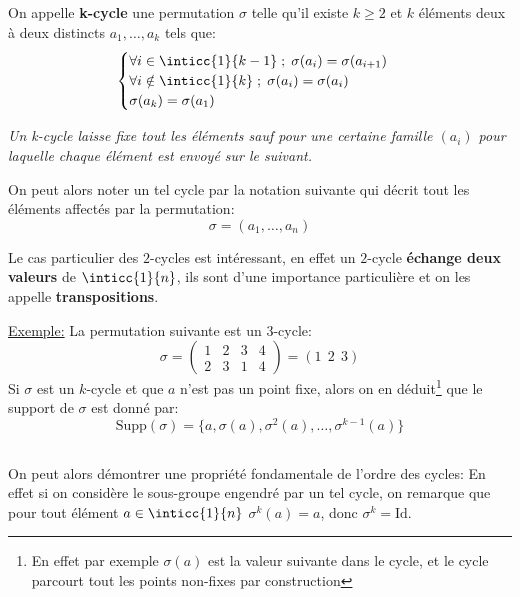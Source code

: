\subsection*{}
On appelle \textbf{k-cycle} une permutation \(\sigma\) telle qu'il existe \(k \geq 2\) et \(k\) éléments deux à deux distincts \(a_1, \ldots, a_k\) tels que:
\[
   \begin{cases}
      \forall i \in \inticc{1}{k-1} \; ; \; \sigma(a_i) = \sigma(a_{i+1}) \\
      \forall i \notin \inticc{1}{k} \; ; \; \sigma(a_i) = \sigma(a_{i}) \\
      \sigma(a_k) = \sigma(a_1)
   \end{cases} 
\]
\begin{center}
   \textit{Un k-cycle laisse fixe tout les éléments sauf pour une certaine famille \((a_i)\) pour laquelle chaque élément est envoyé sur le suivant.}
\end{center}
On peut alors noter un tel cycle par la notation suivante qui décrit tout les éléments affectés par la permutation:
\[
   \sigma = (a_1, \ldots, a_n)  
\]

Le cas particulier des \(2\)-cycles est intéressant, en effet un \(2\)-cycle \textbf{échange deux valeurs} de \(\inticc{1}{n}\), ils sont d'une importance particulière et on les appelle \textbf{transpositions}.\<

\underline{Exemple:} La permutation suivante est un 3-cycle:
\[
   \sigma =  \begin{pmatrix}
      1 & 2 & 3 & 4\\
      2 & 3 & 1 & 4
   \end{pmatrix} = (1 \;\, 2 \;\, 3)
\]
Si \(\sigma\) est un \(k\)-cycle et que \(a\) n'est pas un point fixe, alors on en déduit\footnote[1]{En effet par exemple \(\sigma(a)\) est la valeur suivante dans le cycle, et le cycle parcourt tout les points non-fixes par construction} que le support de \(\sigma\) est donné par:
\[
   \text{Supp}(\sigma) = \bigl\{a, \sigma(a), \sigma^2(a), \ldots, \sigma^{k-1}(a) \bigl\}
\]

\subsection*{}
On peut alors démontrer une propriété fondamentale de l'ordre des cycles:
En effet si on considère le sous-groupe engendré par un tel cycle, on remarque que pour tout élément \(a \in \inticc{1}{n}\) \(\sigma^{k}(a) = a\), donc \(\sigma^{k} = \text{Id}\).

